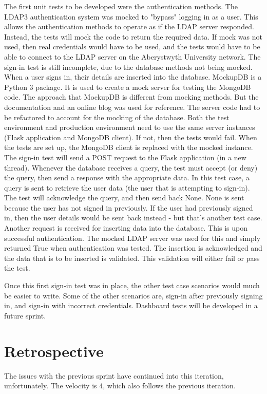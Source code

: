 The first unit tests to be developed were the authentication methods. The LDAP3 authentication system was mocked to "bypass" logging in as a user. This allows the authentication methods to operate as if the LDAP server responded. Instead, the tests will mock the code to return the required data. If mock was not used, then real credentials would have to be used, and the tests would have to be able to connect to the LDAP server on the Aberystwyth University network. The sign-in test is still incomplete, due to the database methods not being mocked. When a user signs in, their details are inserted into the database. MockupDB is a Python 3 package. It is used to create a mock server for testing the MongoDB code. The approach that MockupDB is different from mocking methods. But the documentation and an online blog was used for reference\cite{DavisMongoDB}. The server code had to be refactored to account for the mocking of the database. Both the test environment and production environment need to use the same server instances (Flask application and MongoDB client). If not, then the tests would fail. When the tests are set up, the MongoDB client is replaced with the mocked instance. The sign-in test will send a POST request to the Flask application (in a new thread). Whenever the database receives a query, the test must accept (or deny) the query, then send a response with the appropriate data. In this test case, a query is sent to retrieve the user data (the user that is attempting to sign-in). The test will acknowledge the query, and then send back None. None is sent because the user has not signed in previously. If the user had previously signed in, then the user details would be sent back instead - but that's another test case. Another request is received for inserting data into the database. This is upon successful authentication. The mocked LDAP server was used for this and simply returned True when authentication was tested. The insertion is acknowledged and the data that is to be inserted is validated. This validation will either fail or pass the test.

Once this first sign-in test was in place, the other test case scenarios would much be easier to write. Some of the other scenarios are, sign-in after previously signing in, and sign-in with incorrect credentials. Dashboard tests will be developed in a future sprint.

\section{Retrospective}
The issues with the previous sprint have continued into this iteration, unfortunately. The velocity is 4, which also follows the previous iteration. 
